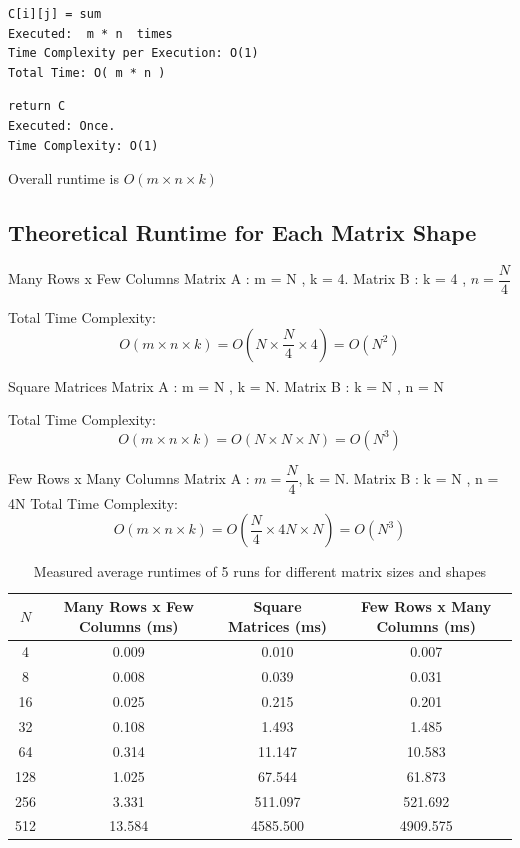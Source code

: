 \documentclass[12 pt]{article}
\begin{document}
\begin{verbatim}
C[i][j] = sum
Executed:  m * n  times
Time Complexity per Execution: O(1)
Total Time: O( m * n )
\end{verbatim}

\begin{verbatim}
return C
Executed: Once.
Time Complexity: O(1)
\end{verbatim}

Overall runtime is $O(m\times n \times k)$

\subsection* {Theoretical Runtime for Each Matrix Shape}

Many Rows x Few Columns
Matrix  A :  m = N ,  k = 4. Matrix  B :  k = 4 , \( n = \dfrac{N}{4} \)

Total Time Complexity:
\[
O(m \times n \times k) = O\left( N \times \dfrac{N}{4} \times 4 \right) = O(N^2)
\]

Square Matrices
Matrix  A :  m = N ,  k = N. Matrix  B :  k = N ,  n = N 

Total Time Complexity:
\[
O(m \times n \times k) = O(N \times N \times N) = O(N^3)
\]

Few Rows x Many Columns
Matrix  A : \( m = \dfrac{N}{4} \),  k = N. Matrix  B :  k = N ,  n = 4N 
Total Time Complexity:
\[
O(m \times n \times k) = O\left( \dfrac{N}{4} \times 4N \times N \right) = O(N^3)
\]

\begin{table}[h!]
\centering
\begin{tabular}{|c|c|c|c|}
\hline
$N$ & Many Rows x Few Columns (ms) & Square Matrices (ms) & Few Rows x Many Columns (ms) \\
\hline
4   & 0.009 & 0.010 & 0.007 \\
\hline
8   & 0.008 & 0.039 & 0.031 \\
\hline
16  & 0.025 & 0.215 & 0.201 \\
\hline
32  & 0.108 & 1.493 & 1.485 \\
\hline
64  & 0.314 & 11.147 & 10.583 \\
\hline
128 & 1.025 & 67.544 & 61.873 \\
\hline
256 & 3.331 & 511.097 & 521.692 \\
\hline
512 & 13.584 & 4585.500 & 4909.575 \\
\hline
\end{tabular}
\caption{Measured average runtimes of 5 runs for different matrix sizes and shapes}
\label{tab:runtime_data}
\end{table}
\end{document}
